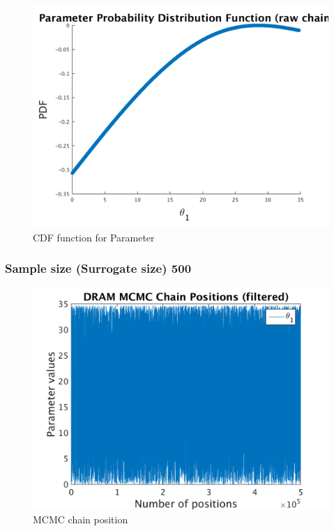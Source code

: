 \begin{figure}[h!]
  
  \centering
   \includegraphics[scale=0.75]{output_100/ip_logLike_unified}
   \caption{CDF function for Parameter }
\end{figure}


\subsubsection{Sample size (Surrogate size) 500 }

\begin{figure}[h!]
  
  \centering
   \includegraphics[scale=0.75]{output_500/simple_ip_chain_pos_filt}
   \caption{MCMC chain position }
\end{figure}



